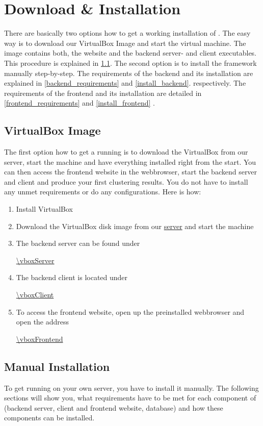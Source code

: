 

	\section{Download \& Installation}\label{sec_inst}
		There are basically two options how to get a working installation of \clusteval. The easy way is to download our VirtualBox Image and start the virtual machine. The image contains both, the website and the backend server- and client executables. This procedure is explained in \ref{subsec_vbox_image}. The second option is to install the framework manually step-by-step. The requirements of the backend and its installation are explained in \ref{backend_requirements} and \ref{install_backend}. respectively. The requirements of the frontend and its installation are detailed in \ref{frontend_requirements} and \ref{install_frontend} .
		\subsection{VirtualBox Image}\label{subsec_vbox_image}
		The first option how to get a running \clusteval is to download the VirtualBox from our server, start the machine and have everything installed right from the start. You can then access the frontend website in the webbrowser, start the backend server and client and produce your first clustering results. You do not have to install any unmet requirements or do any configurations. Here is how:
			\begin{enumerate}
				\item Install VirtualBox
				\item Download the VirtualBox disk image from our \href{\vboxImage}{server} and start the machine
				\item The backend server can be found under 
				
				\url{\vboxServer}
				\item The backend client is located under 
				
				\url{\vboxClient}
				\item To access the frontend website, open up the preinstalled webbrowser and open the address 
				
				\url{\vboxFrontend}
			\end{enumerate}
	\subsection{Manual Installation}
	To get \clusteval running on your own server, you have to install it manually. The following sections will show you, what requirements have to be met for each component of \clusteval (backend server, client and frontend website, database) and how these components can be installed.
	
